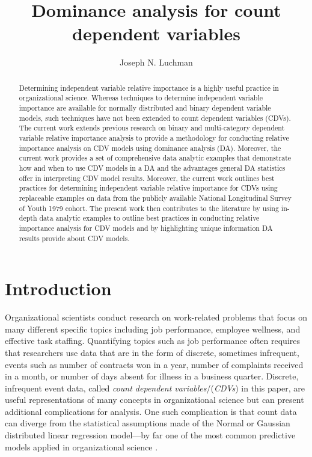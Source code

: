 \documentclass[ShortAfour,times,sageapa]{sagej}
\begin{document}
	
\title{Dominance analysis for count dependent variables}
\author{Joseph N. Luchman}

\begin{abstract}
	Determining independent variable relative importance is a highly useful practice in organizational science.  Whereas techniques to determine independent variable importance are available for normally distributed and binary dependent variable models, such techniques have not been extended to count dependent variables (CDVs).  The current work extends previous research on binary and multi-category dependent variable relative importance analysis to provide a methodology for conducting relative importance analysis on CDV models using dominance analysis (DA).  Moreover, the current work provides a set of comprehensive data analytic examples that demonstrate how and when to use CDV models in a DA and the advantages general DA statistics offer in interpreting CDV model results.  Moreover, the current work outlines best practices for determining independent variable relative importance for CDVs using replaceable examples on data from the publicly available National Longitudinal Survey of Youth 1979 cohort.  The present work then contributes to the literature by using in-depth data analytic examples to outline best practices in conducting relative importance analysis for CDV models and by highlighting unique information DA results provide about CDV models.
\end{abstract}


\maketitle

\section{Introduction}

	Organizational scientists conduct research on work-related problems that focus on many different specific topics including job performance, employee wellness, and effective task staffing.  
	Quantifying topics such as job performance often requires that researchers use data that are in the form of discrete, sometimes infrequent, events such as number of contracts won in a year, number of complaints received in a month, or number of days absent for illness in a business quarter. %
	Discrete, infrequent event data, called \textit{count dependent variables}/(\textit{CDVs}) in this paper, are useful representations of many concepts in organizational science but can present additional complications for analysis.
	One such complication is that count data can diverge from the statistical assumptions made of the Normal or Gaussian distributed linear regression model---by far one of the most common predictive models applied in organizational science \cite{}.
	
\end{document}
